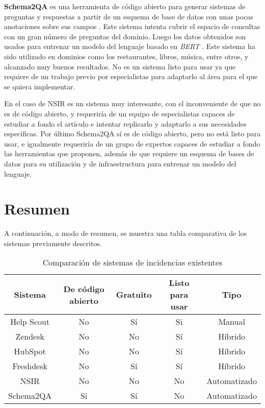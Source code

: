 \textbf{Schema2QA} \cite{s2qa} es una herramienta de código abierto para generar sistemas de preguntas y respuestas a partir de un esquema de base de datos con unas pocas anotaciones sobre sus campos \cite{s2qa}. Este sistema intenta cubrir el espacio de consultas con un gran número de preguntas del dominio. Luego los datos obtenidos son usados para entrenar un modelo del lenguaje basado en \textit{BERT} \cite{bert}. Este sistema ha sido utilizado en dominios como los restaurantes, libros, música, entre otros, y alcanzado muy buenos resultados. No es un sistema listo para usar ya que requiere de un trabajo previo por especialistas para adaptarlo al área para el que se quiera implementar.
\newline


 En el caso de NSIR es un sistema muy interesante, con el inconveniente de que no es de código abierto, y requeriría de un equipo de especialistas capaces de estudiar a fondo el artículo e intentar replicarlo y adaptarlo a sus necesidades específicas. Por último Schema2QA sí es de código abierto, pero no está listo para usar, e igualmente requeriría de un grupo de expertos capaces de estudiar a fondo las herramientas que proponen, además de que requiere un esquema de bases de datos para su utilización y de infraestructura para entrenar un modelo del lenguaje.
 \newline
 
 \section{Resumen}
 
 A continuación, a modo de resumen, se muestra una tabla comparativa de los sistemas previamente descritos.\newline
 
\begin{table}[h]
	 \begin{tabular}{| c | c | c | c | c |}
		\hline
		Sistema & De código abierto & Gratuito & Listo para usar & Tipo \\ \hline
		Help Scout & No & Sí & Si & Manual \\ \hline 
		Zendesk & No & No & Sí & Híbrido \\ \hline
		HubSpot & No & No & Sí & Híbrido \\ \hline
		Freshdesk & No & Sí & Sí & Híbrido \\ \hline
		NSIR & No & No & No & Automatizado \\ \hline
		Schema2QA & Sí & Sí & No & Automatizado \\ \hline
		
	\end{tabular}
\caption{Comparación de sistemas de incidencias existentes}
\label{Sistemas de incidencias}
\end{table}

